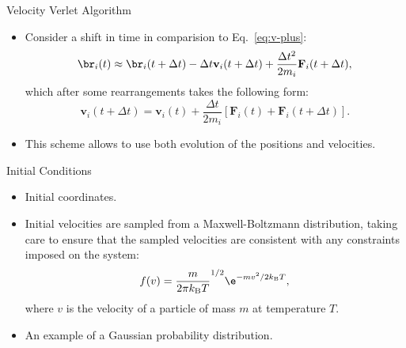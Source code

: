 \documentclass[10pt]{beamer}
\begin{document}
\begin{frame}{Velocity Verlet Algorithm}
\begin{itemize}
\setlength\itemsep{1em}
  \item Consider a shift in time in comparision to Eq.~\ref{eq:v-plus}:
  \begin{equation}
    \br_i(t) \approx \br_i(t+\Delta t) - \Delta t \mathbf{v}_i(t+\Delta t) + \frac{\Delta t^2}{2m_i}\mathbf{F}_i(t+\Delta t),
  \end{equation}
  which after some rearrangements takes the following form:
  \begin{equation}
    \mathbf{v}_i(t+\Delta t) = \mathbf{v}_i(t) + \frac{\Delta t}{2m_i}\left[ \mathbf{F}_i(t) + \mathbf{F}_i(t+\Delta t) \right].
  \end{equation}

  \item This scheme allows to use both evolution of the positions and velocities.
\end{itemize}
\end{frame}

\begin{frame}{Initial Conditions}
\begin{itemize}
\setlength\itemsep{1em}
  \item Initial coordinates.

  \item Initial velocities are sampled from a Maxwell-Boltzmann distribution, taking care to ensure that the sampled velocities are consistent with any constraints imposed on the system:
  \begin{equation}
    f(v) = \frac{m}{2\pi k_\mathrm{B}T}^{1/2} \e^{-mv^2 / 2 k_\mathrm{B}T},
  \end{equation}
  where $v$ is the velocity of a particle of mass $m$ at temperature $T$.

  \item An example of a Gaussian probability distribution.
\end{itemize}
\end{frame}
\end{document}
